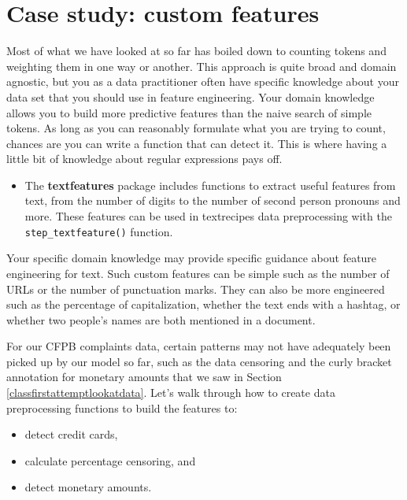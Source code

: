 \documentclass[
]{krantz}
\newenvironment{rmdblock}[1]
  {\begin{shaded*}
  \begin{itemize}[left = -1cm, labelsep = 1cm]
  \renewcommand{\labelitemi}{
    \raisebox{-.7\height}[0pt][0pt]{
      {\setkeys{Gin}{width=3em,keepaspectratio}\texttt{[image: images/\#1]}}
    }
  }
 
  \item
  }
  {
  \end{itemize}
  \end{shaded*}
  }
\newenvironment{rmdpackage}
  {\begin{rmdblock}{package}}
  {\end{rmdblock}}
\begin{document}
\hypertarget{customfeatures}{%
\section{Case study: custom features}\label{customfeatures}}

Most of what we have looked at so far has boiled down to counting tokens and weighting them in one way or another.
This approach is quite broad and domain agnostic, but you as a data practitioner often have specific knowledge about your data set that you should use in feature engineering.
Your domain knowledge allows you to build more predictive features than the naive search of simple tokens.
As long as you can reasonably formulate what you are trying to count, chances are you can write a function that can detect it.
This is where having a little bit of knowledge about regular expressions pays off.

\begin{rmdpackage}
The \textbf{textfeatures} \citep{R-textfeatures} package includes functions to extract useful features from text, from the number of digits to the number of second person pronouns and more. These features can be used in textrecipes data preprocessing with the \texttt{step\_textfeature()} function.
\end{rmdpackage}

Your specific domain knowledge may provide specific guidance about feature engineering for text.
Such custom features can be simple such as the number of URLs or the number of punctuation marks.
They can also be more engineered such as the percentage of capitalization, whether the text ends with a hashtag, or whether two people's names are both mentioned in a document.

For our CFPB complaints data, certain patterns may not have adequately been picked up by our model so far, such as the data censoring and the curly bracket annotation for monetary amounts that we saw in Section \ref{classfirstattemptlookatdata}. Let's walk through how to create data preprocessing functions to build the features to:

\begin{itemize}
\item
  detect credit cards,
\item
  calculate percentage censoring, and
\item
  detect monetary amounts.
\end{itemize}
\end{document}
